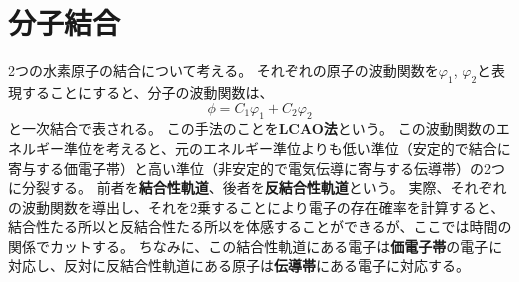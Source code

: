 \documentclass[a4paper]{jsreport}
\begin{document}
        \section{分子結合}
            2つの水素原子の結合について考える。
            それぞれの原子の波動関数を$\varphi_1$, $\varphi_2$と表現することにすると、分子の波動関数は、
            \begin{equation}
                    \phi = C_1 \varphi_1 + C_2 \varphi_2
            \end{equation}
            と一次結合で表される。
            この手法のことを\textbf{LCAO法}という。
            この波動関数のエネルギー準位を考えると、元のエネルギー準位よりも低い準位（安定的で結合に寄与する価電子帯）と高い準位（非安定的で電気伝導に寄与する伝導帯）の2つに分裂する。
            前者を\textbf{結合性軌道}、後者を\textbf{反結合性軌道}という。
            実際、それぞれの波動関数を導出し、それを2乗することにより電子の存在確率を計算すると、結合性たる所以と反結合性たる所以を体感することができるが、ここでは時間の関係でカットする。
            ちなみに、この結合性軌道にある電子は\textbf{価電子帯}の電子に対応し、反対に反結合性軌道にある原子は\textbf{伝導帯}にある電子に対応する。
\end{document}
